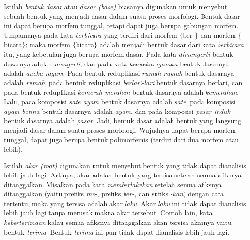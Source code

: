 Istilah \textit{bentuk dasar} atau \textit{dasar (base)} biasanya digunakan untuk menyebut sebuah bentuk yang menjadi dasar dalam suatu proses morfologi. Bentuk dasar ini dapat berupa morfem tunggal, tetapi dapat juga berupa gabungan morfem. Umpamanya pada kata \textit{berbicara} yang terdiri dari morfem $\lbrace$ber-$\rbrace$ dan morfem $\lbrace$bicara$\rbrace$; maka morfem $\lbrace$bicara$\rbrace$ adalah menjadi bentuk dasar dari kata \textit{berbicara} itu, yang kebetulan juga berupa morfem dasar. Pada kata \textit{dimengerti} bentuk dasarnya adalah \textit{mengerti}, dan pada kata \textit{keanekaragaman} bentuk dasarnya adalah \textit{aneka ragam}. Pada bentuk reduplikasi \textit{rumah-rumah} bentuk dasarnya adalah \textit{rumah}, pada bentuk reduplikasi \textit{berlari-lari} bentuk dasarnya berlari, dan pada bentuk reduplikasi \textit{kemerah-merahan} bentuk dasarnya adalah \textit{kemerahan}. Lalu, pada komposisi \textit{sate ayam} bentuk dasarnya adalah \textit{sate}, pada komposisi \textit{ayam betina} bentuk dasarnya adalah \textit{ayam}, dan pada komposisi \textit{pasar induk} bentuk dasarnya adalah \textit{pasar}. Jadi, bentuk dasar adalah bentuk yang langsung menjadi dasar dalam suatu proses morfologi. Wujudnya dapat berupa morfem tunggal, dapat juga berupa bentuk polimorfemis (terdiri dari dua morfem atau lebih).


Istilah \textit{akar (root)} digunakan untuk menyebut bentuk yang tidak dapat dianalisis lebih jauh lagi. Artinya, akar adalah bentuk yang tersisa setelah semua afiksnya ditanggalkan. Misalkan pada kata \textit{memberlakukan} setelah semua afiksnya ditanggalkan (yaitu prefiks \textit{me-}, prefiks \textit{ber-}, dan sufiks \textit{-kan}) dengan cara tertentu, maka yang tersisa adalah akar \textit{laku}. Akar \textit{laku} ini tidak dapat dianalisis lebih jauh lagi tanpa merusak makna akar tersebut. Contoh lain, kata \textit{keberterimaan} kalau semua afiksnya ditanggalkan akan tersisa akarnya yaitu bentuk \textit{terima}. Bentuk \textit{terima} ini pun tidak dapat dianalisis lebih jauh lagi.

